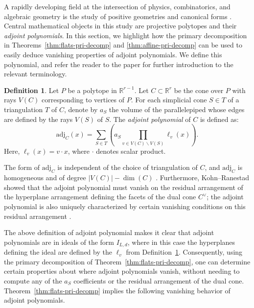 \documentclass [a4paper,reqno, 11pt]{amsart}
\theoremstyle{plain}
\theoremstyle{plain}
\theoremstyle{plain}
\theoremstyle{plain}
\theoremstyle{definition}
\newtheorem{definition}[theorem]{Definition}
\theoremstyle{definition}
\theoremstyle{definition}
\theoremstyle{definition}
\theoremstyle{definition}
\theoremstyle{definition}
\begin{document}
A rapidly developing field at the intersection of physics, combinatorics, and algebraic geometry is the study of positive geometries and canonical forms \cite{Lam,RST}. Central mathematical objects in this study are projective polytopes and their \emph{adjoint polynomials}. In this section, we highlight how the primary decomposition in Theorems~\ref{thm:flats-pri-decomp} and \ref{thm:affine-pri-decomp} can be used to easily deduce vanishing properties of adjoint polynomials. We define this polynomial, and refer the reader to the paper \cite{Gae} for further introduction to the relevant terminology.

\begin{definition}\label{def: adjoint definition}
Let $P$ be a polytope in $\mathbb{R}^{r-1}$. Let $C\subset\mathbb{R}^r$ be the cone over $P$ with rays $V(C)$ corresponding to vertices of $P$. 
 For each simplicial cone $S\in T$ of a triangulation $T$ of $C$, denote by $a_S$ the volume of the parallelepiped whose edges are defined by the rays $V(S)$ of $S$. The \emph{adjoint polynomial} of $C$ is defined as:
\begin{equation*}
\mathrm{adj}_C(x)=\sum_{S\in T}\left(a_S\prod_{v\in V(C)\backslash V(S)}\ell_v(x)\right).
\end{equation*}
Here, $\ell_v(x)=v\cdot x$, where $\cdot$ denotes scalar product.
\end{definition}

The form of $\mathrm{adj}_C$ is independent of the choice of triangulation of $C$, and $\mathrm{adj}_C$ is homogeneous and of degree $|V(C)|-\dim(C)$ \cite{Gae, War}.
Furthermore, Kohn--Ranestad showed that the adjoint polynomial must vanish on the residual arrangement of the 
hyperplane arrangement defining the facets of the dual cone $C^\vee$; the adjoint polynomial is also uniquely characterized by certain vanishing conditions on this residual arrangement \cite{BW,KR}.

The above definition of adjoint polynomial makes it clear that adjoint polynomials are in ideals of the form $I_{L,d}$, where in this case the hyperplanes defining the ideal are defined by the $\ell_{v}$ from Definition~\ref{def: adjoint definition}. 
Consequently, using the primary decomposition of Theorem~\ref{thm:flats-pri-decomp}, one can determine certain properties about where adjoint polynomials vanish, without needing to compute any of the $a_S$ coefficients or the residual arrangement of the dual cone. 
Theorem~\ref{thm:flats-pri-decomp} implies the following vanishing behavior of adjoint polynomials.
\end{document}
